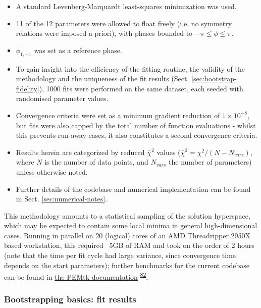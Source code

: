 \documentclass[10pt]{article}
\begin{document}
\begin{itemize}
\item A standard Levenberg-Marquardt least-squares minimization was used.
\item 11 of the 12 parameters were allowed to float freely (i.e. no symmetry relations were imposed a priori), with phases bounded to $-\pi\leq\phi\leq\pi$. %
\item $\phi_{1,-1}$ was set as a reference phase. 
\item To gain insight into the efficiency of the fitting routine, the validity of the methodology and the uniqueness of the fit results (Sect. \ref{sec:bootstrap-fidelity}), 1000 fits were performed on the same dataset, each seeded with randomised parameter values. 
\item Convergence criteria were set as a minimum gradient reduction of $1\times10^{-8}$, %
but fits were also capped by the total number of function evaluations - whilst this prevents run-away cases, it also constitutes a second convergence criteria.
\item Results herein are categorized by reduced $\bar{\chi}^2$ values ($\bar{\chi}^2=\chi^2/(N-N_{vars})$, where $N$ is the number of data points, and $N_{vars}$ the number of parameters) unless otherwise noted.
\item Further details of the codebase and numerical implementation can be found in Sect. \ref{sec:numerical-notes}.
\end{itemize}

This methodology amounts to a statistical sampling of the solution hyperspace, which may be expected to contain some local minima in general high-dimensional cases.  Running in parallel on 20 (logical) cores of an AMD Threadripper 2950X based workstation, this required ~5GB of RAM and took on the order of 2 hours (note that the time per fit cycle had large variance, since convergence time depends on the start parameters); further benchmarks for the current codebase can be found in \href{https://pemtk.readthedocs.io/en/latest/index.html}{the PEMtk documentation} \textsuperscript{\hyperref[csl:82]{82}}.


\subsubsection{Bootstrapping basics: fit results}
\end{document}
